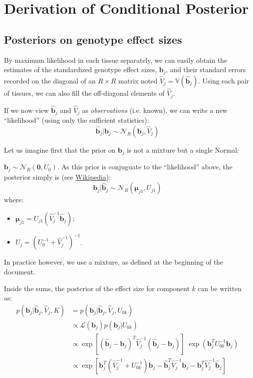 \documentclass[11pt, oneside]{article}   	%
\newcommand{\Var}{\mathbb{V}} %
\newcommand{\Norm}{{\mathcal{N}}} %
\newcommand{\Lik}{{\mathcal{L}}} %
\begin{document}
\section{Derivation of Conditional Posterior}


\subsection{Posteriors on genotype effect sizes}

By maximum likelihood in each tissue separately, we can easily obtain the estimates of the standardized genotype effect sizes, $\hat{\bm{b}}_{j}$, and their standard errors recorded on the diagonal of an $R \times R$ matrix noted $\hat{V}_{j} = \Var(\hat{\bm{b}}_{j})$.
Using each pair of tissues, we can also fill the off-diagonal elements of $\hat{V}_{j}$.

If we now view $\hat{\bm{b}}_{j}$ and $\hat{V}_{j}$ as \emph{observations} (i.e. known), we can write a new ``likelihood'' (using only the sufficient statistics):
\begin{equation}
  \label{new_lik}
  \hat{\bm{b}}_{j} | \bm{b}_{j} \sim \Norm_R(\bm{b}_{j}, \hat{V}_{j})
\end{equation}


Let us imagine first that the prior on $\bm{b}_{j}$ is not a mixture but a single Normal:

$\bm{b}_{j} \sim \Norm_R (\bm{0}, U_{0})$.
As this prior is conjuguate to the ``likelihood'' above, the posterior simply is (see \href{http://en.wikipedia.org/wiki/Conjugate_prior#Continuous_distributions}{Wikipedia}):
\[
\bm{b}_{j} | \hat{\bm{b}}_{j} \sim \Norm_R(\bm{\mu}_{j1}, U_{j1})
\]
where:
\begin{itemize}
\item $\bm{\mu}_{j1} = U_{j1} (\hat{V}_{j}^{-1} \hat{\bm{b}}_{j})$;
\item $U_{j} = (U_{0}^{-1} + \hat{V}_{j}^{-1})^{-1}$.
\end{itemize}

In practice however, we use a mixture, as defined at the beginning of the document.


Inside the sums, the posterior of the effect size for component $k$ can be written as:
\begin{equation}
  \begin{aligned}
    p(\bm{b}_{j} | \hat{\bm{b}}_{j}, \hat{V}_{j}, K) &= p(\bm{b}_{j} | \hat{\bm{b}}_{j}, \hat{V}_{j}, U_{0k}) \\
    &\propto \Lik(\bm{b}_{j}) p(\bm{b}_{j} | U_{0k}) \\
    &\propto \exp[(\hat{\bm{b}}_{j} - \bm{b}_{j})^T \hat{V}_{j}^{-1} (\hat{\bm{b}}_{j} - \bm{b}_{j})] \; \exp(\bm{b}_{j}^T U_{0k}^{-1} \bm{b}_{j}) \\
    &\propto \exp[\bm{b}_{j}^T (\hat{V}_{j}^{-1} + U_{0k}^{-1}) \bm{b}_{j} - \hat{\bm{b}}_{j}^T \hat{V}_{j}^{-1} \bm{b}_{j} - \bm{b}_{j}^T \hat{V}_{j}^{-1} \hat{\bm{b}}_{j}]
  \end{aligned}
\end{equation}
\end{document}
